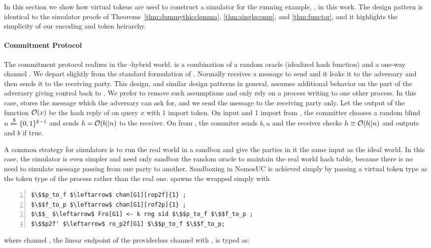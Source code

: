 In this section we show how virtual tokens are used to construct a simulator for the running example, \Fcom, in this work.
The design pattern is identical to the simulator proofs of Theorems~\ref{thm:dummythicclemma}, \ref{thm:singlecomp}, and \ref{thm:functor}, and it highlights the simplicity of our encoding and token heirarchy.

\paragraph*{\textbf{Commitment Protocol}}
The commitment protocol realizes \Fcom in the \Fropp-hybrid world.
\Fropp is a combination of a random oracle \Fro (idealized hash function) and a one-way channel \Fauth.
We depart slightly from the standard formulation of \Fauth. Normally \Fauth receives a message to send and it leaks it to the adversary and then sends it to the receiving party.
This design, and similar design patterns in general, assumes additional behavior on the part of the adverasry giving control back to \Fauth. 
We prefer to remove such assumptions and only rely on a process writing to one other process. In this case, \Fauth stores the message which the adversary can 
ask for, and we send the message to the receiving party only.
Let the output of the function $\mathcal{O}(x)$ be the hash reply of \Fropp on query $x$ with 1 import token.
On input  and 1 import from \Z, the committer chooses a random blind $n \xleftarrow{\$} \{0,1\}^{k-1}$ and sends $h = \mathcal{O}(b || n)$ to the receiver. 
On  from \Z, the commiter sends $b,n$ and the receiver checks $h \equiv \mathcal{O}(b || n)$ and outputs  and $b$ if true. 

A common strategy for simulators is to run the real world in a sandbox and give the parties in it the same input as the ideal world. 
In this case, the simulator \simcom is even simpler and need only sandbox the random oracle \Fro to maintain the real world hash table, because there is no need to simulate message passing from one party to another. 
Sandboxing in NomosUC is achieved simply by passing a virtual token type as the token type of the process rather than the real one. 
\simcom spawns the wrapped \Fro simply with
\begin{lstlisting}[basicstyle=\footnotesize\BeraMonottFamily, mathescape, frame=single, numbers=left, xleftmargin=2em, xrightmargin=2em]
$\$$p_to_f $\leftarrow$ chan[G1][rop2f]{1} ;
$\$$f_to_p $\leftarrow$ chan[G1][rof2p]{1} ;
$\$$_ $\leftarrow$ Fro[G1] <- k rng sid $\$$p_to_f $\$$f_to_p ;
$\$$p2f' $\leftarrow$ ro_p2f[G1] $\$$p_to_f $\$$f_to_p;
\end{lstlisting}
where channel , the linear endpoint of the providerless channel with \Fro, is typed as:

